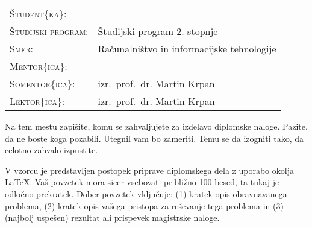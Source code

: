 \documentclass{feridiploma}
\begin{document}
	\naslovnica
	
	\setcounter{page}{1}
	\renewcommand{\thepage}{}
	
	\begin{drugastran}
		\begin{table}[b]
			\begin{tabular}{ll}
				{\textsc{Študent\{ka\}}}: & \ptauthor \\
				{\textsc{Študijski program}:} & Študijski program 2. stopnje \\
				{\textsc{Smer}:} & Računalništvo in informacijske tehnologije \\
				{\textsc{Mentor\{ica\}}:} & \ptmenthor \\
				{\textsc{Somentor\{ica\}}:} & izr.\ prof.\ dr. Martin Krpan \\
				{\textsc{Lektor\{ica\}}:} & izr.\ prof.\ dr. Martin Krpan 
			\end{tabular}
		\end{table}
	\end{drugastran}

	\begin{zahvala}
	    Na tem mestu zapišite, komu se zahvaljujete za izdelavo diplomske naloge. Pazite, da ne boste koga pozabili. Utegnil vam bo zameriti. Temu se da izogniti tako, da celotno zahvalo izpustite.
	\end{zahvala}

	\begin{povzetek}
		V vzorcu je predstavljen postopek priprave diplomskega dela z uporabo okolja \LaTeX.
		Vaš povzetek mora sicer vsebovati približno 100 besed, ta tukaj je odločno prekratek.
		Dober povzetek vključuje: (1) kratek opis obravnavanega problema, (2) kratek opis vašega pristopa za reševanje tega problema in (3) (najbolj uspešen) rezultat ali prispevek magistrske naloge.
	\end{povzetek}
\end{document}
